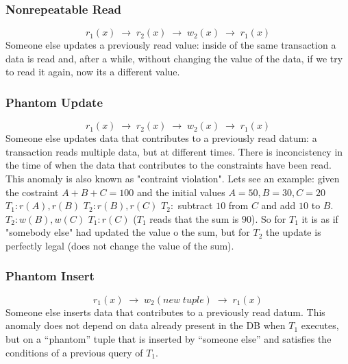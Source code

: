\subsubsection{Nonrepeatable Read}
\[
    r_1(x) \; \rightarrow \; r_2(x) \; \rightarrow \; w_2(x) \; \rightarrow \; r_1(x)
\]
Someone else updates a previously read value: inside of the same transaction a data is read and, after a while, without changing the value of the data, if we try to read it again, now its a different value.
\subsubsection{Phantom Update}
\[
    r_1(x) \; \rightarrow \; r_2(x) \; \rightarrow \; w_2(x) \; \rightarrow \; r_1(x)
\]
Someone else updates data that contributes to a previously read datum: a transaction reads multiple data, but at different times. There is inconcistency in the time of when the data that contributes to the constraints have been read.\newline
\newline
This anomaly is also known as "contraint violation".
\newline
Lets see an example: given the costraint $A+B+C = 100$ and the initial values $A = 50, B = 30, C = 20$\newline
$T_1 : r(A), r(B)$\newline
$T_2 : r(B), r(C)$\newline
$T_2 : $ subtract $10$ from $C$ and add $10$ to $B$.\newline
$T_2 : w(B), w(C)$\newline
$T_1 : r(C)$ ($T_1$ reads that the sum is $90$).\newline
So for $T_1$ it is as if "somebody else" had updated the value o the sum, but for $T_2$ the update is perfectly legal (does not change the value of the sum). 
\subsubsection{Phantom Insert}
\[
    r_1(x) \; \rightarrow \; w_2(new\; tuple) \; \rightarrow \; r_1(x)
\]
Someone else inserts data that contributes to a previously read datum.\newline
\newline
This anomaly does not depend on data already present in the DB when $T_1$ executes, but on a “phantom” tuple that is inserted by “someone else” and satisfies the conditions of a previous query of $T_1$.
